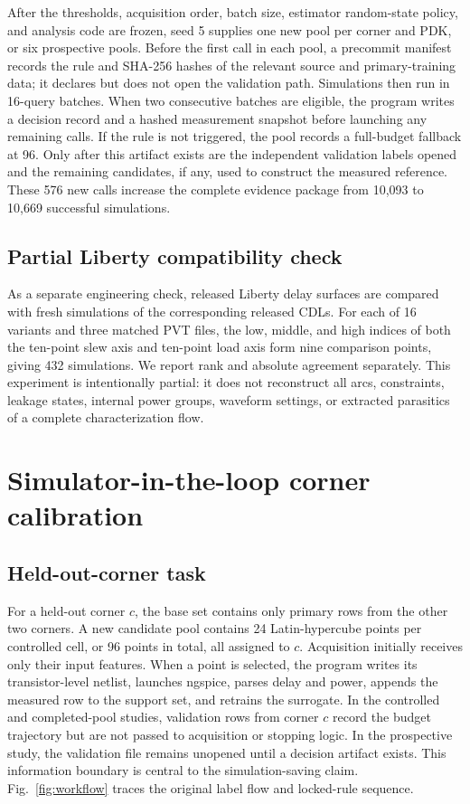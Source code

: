 \documentclass[preprint,12pt]{elsarticle}
\begin{document}
After the thresholds, acquisition order, batch size, estimator random-state policy, and analysis code are frozen, seed 5 supplies one new pool per corner and PDK, or six prospective pools. Before the first call in each pool, a precommit manifest records the rule and SHA-256 hashes of the relevant source and primary-training data; it declares but does not open the validation path. Simulations then run in 16-query batches. When two consecutive batches are eligible, the program writes a decision record and a hashed measurement snapshot before launching any remaining calls. If the rule is not triggered, the pool records a full-budget fallback at 96. Only after this artifact exists are the independent validation labels opened and the remaining candidates, if any, used to construct the measured reference. These 576 new calls increase the complete evidence package from 10,093 to 10,669 successful simulations.

\subsection{Partial Liberty compatibility check}

As a separate engineering check, released Liberty delay surfaces are compared with fresh simulations of the corresponding released CDLs. For each of 16 variants and three matched PVT files, the low, middle, and high indices of both the ten-point slew axis and ten-point load axis form nine comparison points, giving 432 simulations. We report rank and absolute agreement separately. This experiment is intentionally partial: it does not reconstruct all arcs, constraints, leakage states, internal power groups, waveform settings, or extracted parasitics of a complete characterization flow.

\section{Simulator-in-the-loop corner calibration}

\subsection{Held-out-corner task}

For a held-out corner $c$, the base set contains only primary rows from the other two corners. A new candidate pool contains 24 Latin-hypercube points per controlled cell, or 96 points in total, all assigned to $c$. Acquisition initially receives only their input features. When a point is selected, the program writes its transistor-level netlist, launches ngspice, parses delay and power, appends the measured row to the support set, and retrains the surrogate. In the controlled and completed-pool studies, validation rows from corner $c$ record the budget trajectory but are not passed to acquisition or stopping logic. In the prospective study, the validation file remains unopened until a decision artifact exists. This information boundary is central to the simulation-saving claim. Fig.~\ref{fig:workflow} traces the original label flow and locked-rule sequence.
\end{document}
